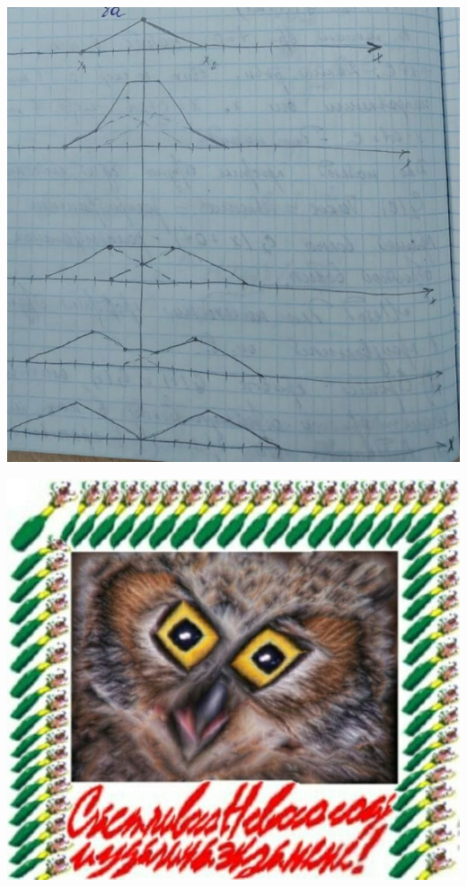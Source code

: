 \documentclass[../main.tex]{subfiles}
\begin{document}
\includegraphics[scale=0.5]{graph_1.jpg}

\includegraphics[scale=0.5]{example.jpg}
\end{document}
